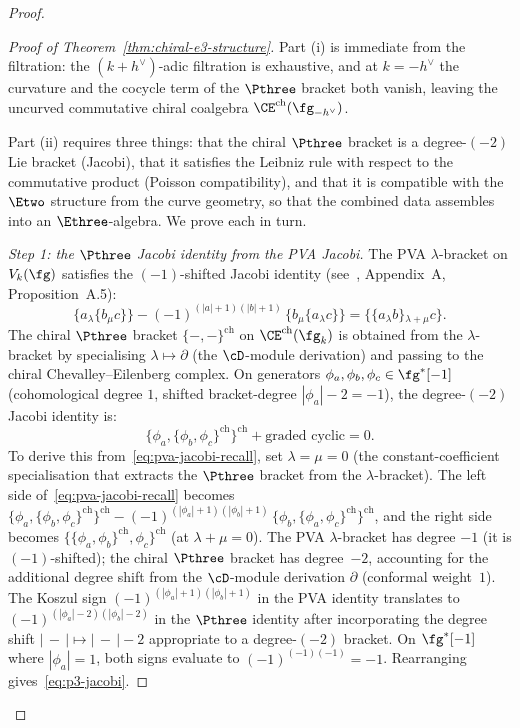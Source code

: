 \begin{proof}
\begin{proof}[Proof of Theorem~\ref{thm:chiral-e3-structure}]
Part (i) is immediate from the filtration: the $(k+h^\vee)$-adic
filtration is exhaustive, and at $k = -h^\vee$ the curvature
and the cocycle term of the $\Pthree$ bracket both vanish,
leaving the uncurved commutative chiral coalgebra
$\CE^{\mathrm{ch}}(\fg_{-h^\vee})$.

Part (ii) requires three things: that the chiral
$\Pthree$ bracket is a degree-$(-2)$ Lie bracket
(Jacobi), that it satisfies the Leibniz rule with respect
to the commutative product (Poisson compatibility), and
that it is compatible with the $\Etwo$ structure from
the curve geometry, so that the combined data assembles
into an $\Ethree$-algebra. We prove each in turn.

\textit{Step 1: the $\Pthree$ Jacobi identity from the
PVA Jacobi.}
The PVA $\lambda$-bracket on $V_k(\fg)$ satisfies the
$(-1)$-shifted Jacobi identity
(see~\cite{Lorgat26II}, Appendix~A, Proposition~A.5):
\begin{equation}\label{eq:pva-jacobi-recall}
  \{a \mathbin{{}_\lambda} \{b \mathbin{{}_\mu} c\}\}
  - (-1)^{(|a|+1)(|b|+1)}\,
  \{b \mathbin{{}_\mu} \{a \mathbin{{}_\lambda} c\}\}
  = \{\{a \mathbin{{}_\lambda} b\}
  \mathbin{{}_{{\lambda+\mu}}} c\}.
\end{equation}
The chiral $\Pthree$ bracket
$\{-,-\}^{\mathrm{ch}}$
on $\CE^{\mathrm{ch}}(\fg_k)$ is obtained from the
$\lambda$-bracket by specialising $\lambda \mapsto \partial$
(the $\cD$-module derivation) and passing to the chiral
Chevalley--Eilenberg complex. On generators
$\phi_a, \phi_b, \phi_c \in \fg^*[-1]$
(cohomological degree $1$, shifted bracket-degree
$|\phi_a| - 2 = -1$), the degree-$(-2)$ Jacobi identity
is:
\begin{equation}\label{eq:p3-jacobi}
  \{\phi_a, \{\phi_b, \phi_c\}^{\mathrm{ch}}\}^{\mathrm{ch}}
  + \text{graded cyclic}
  = 0.
\end{equation}
To derive this from~\eqref{eq:pva-jacobi-recall}, set
$\lambda = \mu = 0$ (the constant-coefficient specialisation
that extracts the $\Pthree$ bracket from the
$\lambda$-bracket). The left side
of~\eqref{eq:pva-jacobi-recall} becomes
$\{\phi_a, \{\phi_b, \phi_c\}^{\mathrm{ch}}\}^{\mathrm{ch}}
- (-1)^{(|\phi_a|+1)(|\phi_b|+1)}\,
\{\phi_b, \{\phi_a, \phi_c\}^{\mathrm{ch}}\}^{\mathrm{ch}}$,
and the right side becomes
$\{\{\phi_a, \phi_b\}^{\mathrm{ch}},
\phi_c\}^{\mathrm{ch}}$ (at $\lambda + \mu = 0$).
The PVA $\lambda$-bracket has degree $-1$ (it is
$(-1)$-shifted); the chiral $\Pthree$ bracket has
degree~$-2$, accounting for the additional degree shift
from the $\cD$-module derivation $\partial$ (conformal
weight~$1$). The Koszul sign
$(-1)^{(|\phi_a|+1)(|\phi_b|+1)}$ in the PVA identity
translates to $(-1)^{(|\phi_a|-2)(|\phi_b|-2)}$ in the
$\Pthree$ identity after incorporating the degree shift
$|\,{-}\,| \mapsto |\,{-}\,| - 2$ appropriate to a
degree-$(-2)$ bracket. On $\fg^*[-1]$ where
$|\phi_a| = 1$, both signs evaluate to
$(-1)^{(-1)(-1)} = -1$. Rearranging
gives~\eqref{eq:p3-jacobi}.


\end{proof}
\end{proof}
